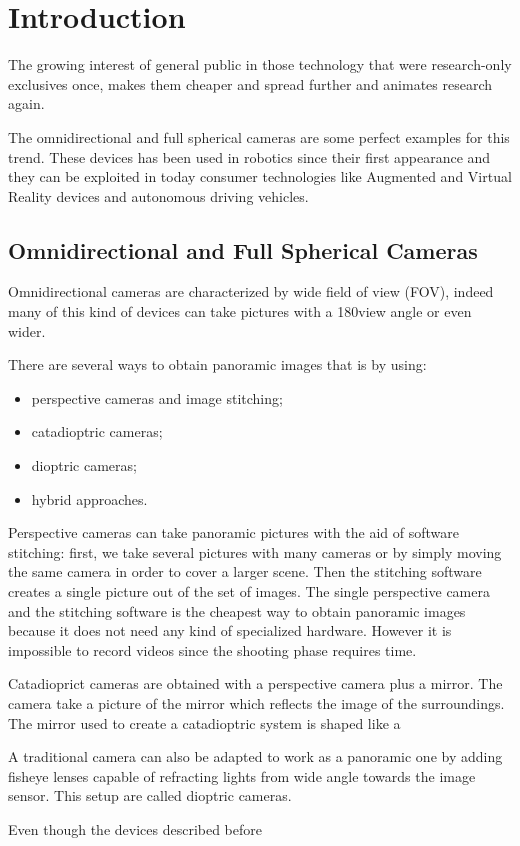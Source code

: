 \chapter{Introduction}
The growing interest of general public in those technology that were 
research-only exclusives once, makes them cheaper and spread further and
animates research again.

The omnidirectional and full spherical cameras are some perfect examples for 
this trend.
These devices has been used in robotics since their first appearance and they 
can be exploited in today consumer technologies like Augmented and Virtual 
Reality devices and autonomous driving vehicles.

\section{Omnidirectional and Full Spherical Cameras}
\label{sec:cameraclassification}
Omnidirectional cameras are characterized by wide field of view (FOV), 
indeed many of this kind
of devices can take pictures with a 180\degree view angle or even wider.

There are several ways to obtain panoramic images that is by using:
\begin{itemize}
	\item perspective cameras and image stitching;
	\item catadioptric cameras;
	\item dioptric cameras;
	\item hybrid approaches.
\end{itemize}

Perspective cameras can take panoramic pictures with the aid of 
software stitching: first, we take several pictures with many cameras or by
simply moving 
the same camera in order to cover a larger scene. Then the stitching software 
creates a single picture out of the set of images.
The single perspective camera and the stitching software is the cheapest 
way to obtain panoramic images because it does not need any kind of specialized 
hardware. However it is impossible to record videos since the shooting phase 
requires time.

Catadioprict cameras are obtained with a perspective camera plus a mirror. 
The camera take a picture of the mirror which reflects the image of the 
surroundings. The mirror used to create a catadioptric system is shaped like a 


A traditional camera can also be adapted to work as a panoramic one by adding
fisheye lenses capable of refracting lights from wide angle towards the 
image sensor. This setup are called dioptric cameras.

Even though the devices described before 
